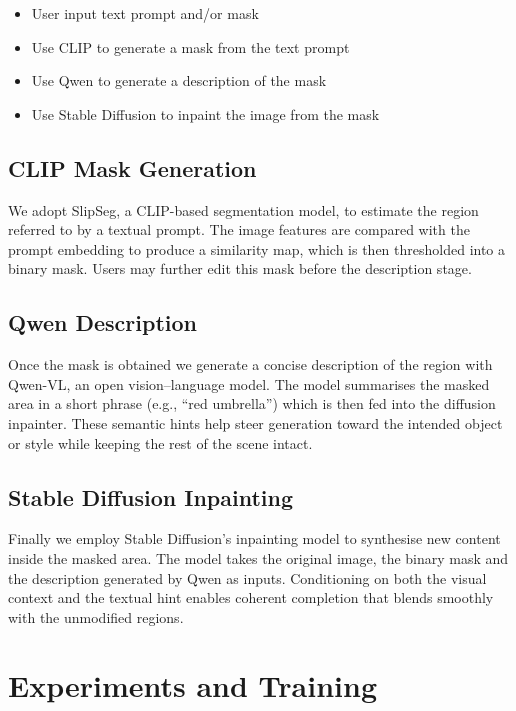 \documentclass{article}
\begin{document}
\begin{itemize}
    \item User input text prompt and/or mask
    \item Use CLIP to generate a mask from the text prompt
    \item Use Qwen to generate a description of the mask
    \item Use Stable Diffusion to inpaint the image from the mask
\end{itemize}


\subsection{CLIP Mask Generation}


We adopt SlipSeg, a CLIP-based segmentation model, to estimate the region
referred to by a textual prompt. The image features are compared with the prompt
embedding to produce a similarity map, which is then thresholded into a binary
mask. Users may further edit this mask before the description stage.


\subsection{Qwen Description}


Once the mask is obtained we generate a concise description of the region with
Qwen-VL, an open vision--language model. The model summarises the masked area in
a short phrase (e.g., ``red umbrella'') which is then fed into the diffusion
inpainter. These semantic hints help steer generation toward the intended object
or style while keeping the rest of the scene intact.


\subsection{Stable Diffusion Inpainting}


Finally we employ Stable Diffusion's inpainting model to synthesise new content
inside the masked area. The model takes the original image, the binary mask and
the description generated by Qwen as inputs. Conditioning on both the visual
context and the textual hint enables coherent completion that blends smoothly
with the unmodified regions.


\section{Experiments and Training}
\end{document}
